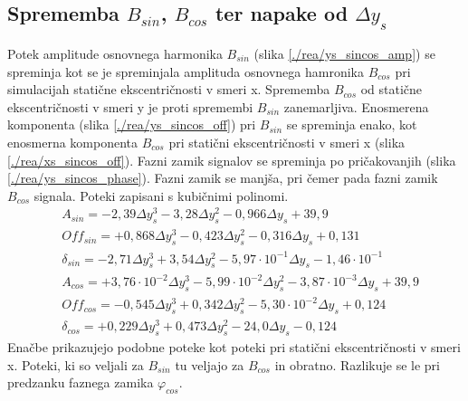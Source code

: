 \subsection{Sprememba $B_{sin}$, $B_{cos}$ ter napake od $\Delta y_s$}
Potek amplitude osnovnega harmonika $B_{sin}$ (slika \ref{./rea/ys_sincos_amp}) se spreminja kot se je spreminjala amplituda osnovnega hamronika $B_{cos}$ pri simulacijah statične ekscentričnosti v smeri x. Sprememba $B_{cos}$ od statične ekscentričnosti v smeri y je proti spremembi $B_{sin}$ zanemarljiva. Enosmerena komponenta (slika \ref{./rea/ys_sincos_off}) pri $B_{sin}$ se spreminja enako, kot enosmerna komponenta $B_{cos}$ pri statični ekscentričnosti v smeri x (slika \ref{./rea/xs_sincos_off}).  Fazni zamik signalov se spreminja po pričakovanjih (slika \ref{./rea/ys_sincos_phase}). Fazni zamik se manjša, pri čemer pada fazni zamik $B_{cos}$ signala.%
Poteki zapisani s kubičnimi polinomi.
\begin{eqnarray}
&A_{sin} = -2,39\Delta y_s^3-3,28\Delta y_s^2-0,966\Delta y_s+39,9\\     
&Off_{sin} = +0,868\Delta y_s^3-0,423\Delta y_s^2-0,316\Delta y_s+0,131\\   
&\delta_{sin} = -2,71\Delta y_s^3+3,54\Delta y_s^2-5,97\cdot 10^{-1}\Delta y_s-1,46\cdot 10^{-1}\\
&A_{cos} = +3,76\cdot 10^{-2}\Delta y_s^3-5,99\cdot 10^{-2}\Delta y_s^2-3,87\cdot 10^{-3}\Delta y_s+39,9\\     
&Off_{cos} = -0,545\Delta y_s^3+0,342\Delta y_s^2-5,30\cdot 10^{-2}\Delta y_s+0,124\\   
&\delta_{cos} = +0,229\Delta y_s^3+0,473\Delta y_s^2-24,0\Delta y_s-0,124  
\end{eqnarray}
Enačbe prikazujejo podobne poteke kot poteki pri statični ekscentričnosti v smeri x. Poteki, ki so veljali za $B_{sin}$ tu veljajo za $B_{cos}$ in obratno. Razlikuje se le pri predzanku faznega zamika $\varphi_{cos}$. 

